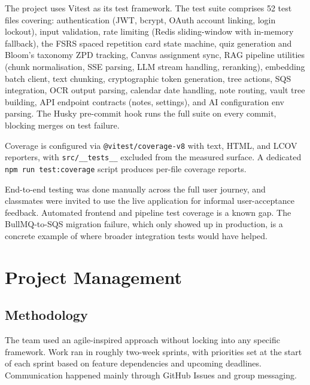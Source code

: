 \documentclass[12pt,a4paper]{article}
\begin{document}
The project uses Vitest as its test framework. The test suite comprises 52 test files covering: authentication (JWT, bcrypt, OAuth account linking, login lockout), input validation, rate limiting (Redis sliding-window with in-memory fallback), the FSRS spaced repetition card state machine, quiz generation and Bloom's taxonomy ZPD tracking, Canvas assignment sync, RAG pipeline utilities (chunk normalisation, SSE parsing, LLM stream handling, reranking), embedding batch client, text chunking, cryptographic token generation, tree actions, SQS integration, OCR output parsing, calendar date handling, note routing, vault tree building, API endpoint contracts (notes, settings), and AI configuration env parsing. The Husky pre-commit hook runs the full suite on every commit, blocking merges on test failure.

\begin{sloppypar}
Coverage is configured via \texttt{@vitest/coverage-v8} with text, HTML, and LCOV reporters, with \texttt{src/\_\_tests\_\_} excluded from the measured surface. A dedicated \texttt{npm run test:coverage} script produces per-file coverage reports.
\end{sloppypar}

End-to-end testing was done manually across the full user journey, and classmates were invited to use the live application for informal user-acceptance feedback. Automated frontend and pipeline test coverage is a known gap. The BullMQ-to-SQS migration failure, which only showed up in production, is a concrete example of where broader integration tests would have helped.


\section{Project Management}
\label{sec:pm}

\subsection{Methodology}

The team used an agile-inspired approach without locking into any specific framework. Work ran in roughly two-week sprints, with priorities set at the start of each sprint based on feature dependencies and upcoming deadlines. Communication happened mainly through GitHub Issues and group messaging.
\end{document}
